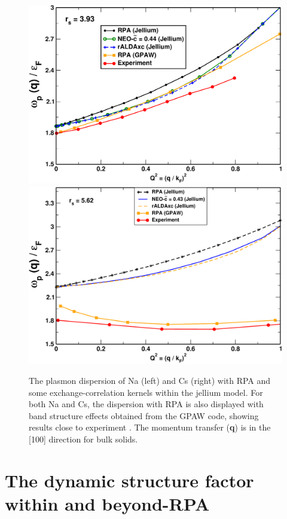 \documentclass[aps,amsmath,amssymb, preprint, 12pt]{revtex4-1}
\begin{document}
\begin{figure}[h!]
\centering
		\includegraphics[scale=0.32]{figure_14.pdf}
		\includegraphics[scale=0.32]{figure_8.pdf}
\caption{The plasmon dispersion of Na (left) and Cs (right) with RPA and some exchange-correlation kernels within the jellium model. For both Na and Cs, the dispersion with RPA is also displayed with band structure effects obtained from the GPAW code, showing results close to experiment \cite{VSF89}. The momentum transfer (\textbf{q}) is in the [100] direction for bulk solids.}
\label{real}
\end{figure}




\section{The dynamic structure factor within and beyond-RPA}
\end{document}

